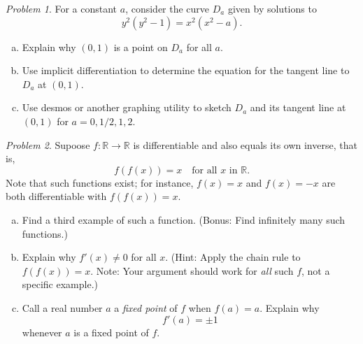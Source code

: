 \documentclass[11pt,twoside]{amsart}
\theoremstyle{plain}
\theoremstyle{remark}
\newtheorem{prob}{Problem}
\theoremstyle{definition}
\theoremstyle{definition}
\newcommand{\RR}{\mathbb{R}}
\begin{document}
\begin{prob}
For a constant $a$, consider the curve $D_a$ given by solutions to
\[
  y^2(y^2-1)=x^2(x^2-a).
\]
\begin{enumerate}[(a)]
\item Explain why $(0,1)$ is a point on $D_a$ for all $a$.
\item Use implicit differentiation to determine the equation for the tangent line to $D_a$ at $(0,1)$.
\item Use desmos or another graphing utility to sketch $D_a$ and its tangent line at $(0,1)$ for $a=0,1/2,1,2$.
\end{enumerate}
\end{prob}

\begin{prob}
Supoose $f\colon \mathbb{R}\to \mathbb{R}$ is differentiable and also equals its own inverse, that is,
\[
  f(f(x))=x\quad\text{for all $x$ in }\RR.
\]
Note that such functions exist; for instance, $f(x)=x$ and $f(x)=-x$ are both differentiable with $f(f(x))=x$.
\begin{enumerate}[(a)]
\item Find a third example of such a function. (Bonus: Find infinitely many such functions.)
\item Explain why $f'(x)\ne 0$ for all $x$. (Hint: Apply the chain rule to $f(f(x))=x$. Note: Your argument should work for \emph{all} such $f$, not a specific example.)
\item Call a real number $a$ a \emph{fixed point} of $f$ when $f(a)=a$. Explain why
\[
  f'(a) = \pm 1
\]
whenever $a$ is a fixed point of $f$.
\end{enumerate}
\end{prob}
\end{document}

